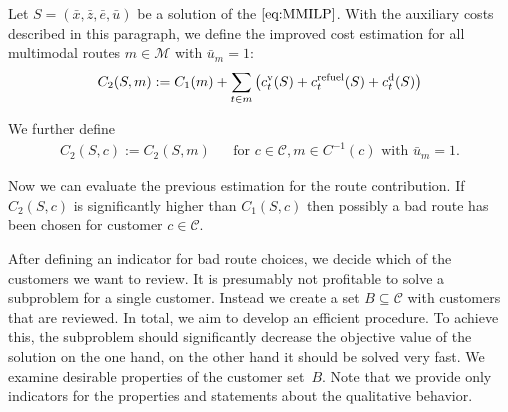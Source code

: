 \begin{definition}

Let $S=\left(\bar{x},\bar{z},\bar{e},\bar{u}\right)$ be a solution of the $\eqref{eq:MMILP}$. With the auxiliary costs described in this paragraph, we define the improved cost estimation for all multimodal routes ${m\in\mathcal{M}}$ with ${\bar{u}_m=1}$:
\begin{align*}
	C_2(S,m) := C_1(m) + \sum_{t\in m}\left(c^{\operatorname{v}}_t(S) + c^{\operatorname{refuel}}_t(S) + c^{\operatorname{d}}_t(S)\right)
\end{align*}

We further define
\begin{align*}
	C_2(S,c) := C_2(S,m) && \text{for } c\in\mathcal{C},m\in C^{-1}(c) \text{ with } \bar{u}_m = 1.
\end{align*}

\end{definition}

Now we can evaluate the previous estimation for the route contribution. If $C_2(S,c)$ is significantly higher than $C_1(S,c)$ then possibly a bad route has been chosen for customer $c\in\mathcal{C}$.

After defining an indicator for bad route choices, we decide which of the customers we want to review. It is presumably not profitable to solve a subproblem for a single customer. Instead we create a set ${B\subseteq\mathcal{C}}$ with customers that are reviewed. In total, we aim to develop an efficient procedure. To achieve this, the subproblem should significantly decrease the objective value of the solution on the one hand, on the other hand it should be solved very fast. We examine desirable properties of the customer set~$B$. Note that we provide only indicators for the properties and statements about the qualitative behavior.

